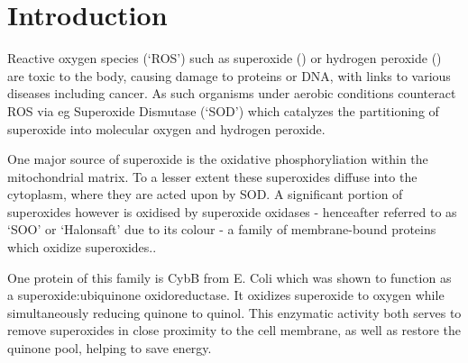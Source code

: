 \part{Introduction}

Reactive oxygen species (`ROS') such as superoxide () or hydrogen
peroxide () are toxic to the body, causing damage to proteins or DNA,
with links to various diseases including cancer. As such organisms under
aerobic conditions counteract ROS via eg Superoxide Dismutase (`SOD') which
catalyzes the partitioning of superoxide into molecular oxygen and hydrogen
peroxide.

One major source of superoxide is the oxidative phosphoryliation within the
mitochondrial matrix. \cite{Novo2008} To a lesser extent these superoxides
diffuse into the cytoplasm, where they are acted upon by SOD. A significant
portion of superoxides however is oxidised by superoxide oxidases - henceafter
referred to as `SOO' or `Halonsaft' due to its colour - a family of
membrane-bound proteins which oxidize superoxides.\cite{superoxide_salvaging}.

One protein of this family is CybB from E. Coli which was shown to function as
a superoxide:ubiquinone oxidoreductase. It oxidizes superoxide to oxygen while
simultaneously reducing quinone to quinol.\cite{superoxide_salvaging} This
enzymatic activity both serves to remove superoxides in close proximity to the
cell membrane, as well as restore the quinone pool, helping to save energy.

